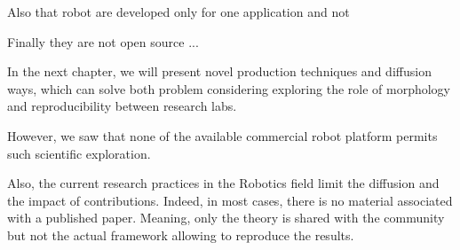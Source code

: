 Also that robot are developed only for one application and not

Finally they are not open source ...


In the next chapter, we will present novel production techniques and diffusion ways, which can solve both problem considering exploring the role of morphology and reproducibility between research labs.


However, we saw that none of the available commercial robot platform permits such scientific exploration.

Also, the current research practices in the Robotics field limit the diffusion and the impact of contributions.
Indeed, in most cases, there is no material associated with a published paper.
Meaning, only the theory is shared with the community but not the actual framework allowing to reproduce the results.






